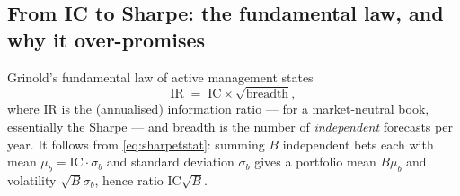 \subsection{From IC to Sharpe: the fundamental law, and why it over-promises}
\label{sec:nonlinear:fundamentallaw}

Grinold's fundamental law of active management states
\begin{equation}
  \mathrm{IR} \;=\; \mathrm{IC}\times\sqrt{\text{breadth}},
  \label{eq:fundamentallaw}
\end{equation}
where IR is the (annualised) information ratio --- for a market-neutral book, essentially
the Sharpe --- and breadth is the number of \emph{independent} forecasts per year. It
follows from \eqref{eq:sharpetstat}: summing $B$ independent bets each with mean
$\mu_b=\mathrm{IC}\cdot\sigma_b$ and standard deviation $\sigma_b$ gives a portfolio mean
$B\mu_b$ and volatility $\sqrt B\sigma_b$, hence ratio $\mathrm{IC}\sqrt B$.

